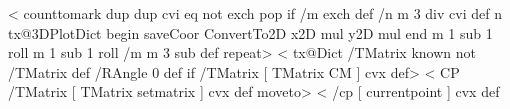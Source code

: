 %
\def\parametricPlotThreeD@iv{%
  \addto@pscode{%
    mark
    /n 0 def
    \psk@ThreeDplot@xPlotpoints\space {
      xyz
      /n n 2 add def
      n 2 roll
      /t t dt add def
    } repeat
  }%
  \@nameuse{endplot@\psplotstyle}%
}
%
%
\def\fileplotThreeD{\def\pst@par{}\pst@object{fileplotThreeD}}
\def\fileplotThreeD@i#1{%
    \pst@killglue%
    \begingroup%
	\use@par%
	\@pstfalse%
	\@nameuse{testqp@\psplotstyle}%
	\if@pst
	    \dataplotThreeD@ii{\pst@readfile{#1}}%
	\else
	    \listplotThreeD@ii{\pst@altreadfile{#1}}%
	\fi
    \endgroup%
    \ignorespaces%
}
%
%
\def\dataplotThreeD{\def\pst@par{}\pst@object{dataplotThreeD}}
\def\dataplotThreeD@i#1{%
  \pst@killglue
  \begingroup
    \use@par
    \@pstfalse
    \@nameuse{testqp@\psplotstyle}%
    \if@pst
      \dataplotThreeD@ii{\addto@pscode{#1}}%
    \else
      \listplot@ii{\addto@pscode{#1}}%
    \fi
  \endgroup
  \ignorespaces%
}
\def\dataplotThreeD@ii#1{%
  \@nameuse{beginplot@\psplotstyle}%
    \addto@pscode{%
      \IIIDplot@variables
      /Dx { /D { Dy } def } def
      /Dy { /D { Dz } def } def
      /Dz { 			%
        tx@3DPlotDict begin
	saveCoor
	ConvertTo2D
	x2D \pst@number\psxunit mul y2D \pst@number\psyunit mul 
	end
	Do /D { Dx } def } def
      /D { /D { Dx } def } def
      /Do {
        \@nameuse{beginqp@\psplotstyle}%
        /Do { \@nameuse{doqp@\psplotstyle}} def
      } def}%
    #1%
    \addto@pscode{D}%
  \@nameuse{endqp@\psplotstyle}%
}
%
%
<%
  counttomark dup dup cvi eq not { exch pop } if
  /m exch def /n m 3 div cvi def
  n { 				%
    tx@3DPlotDict begin
    saveCoor
    ConvertTo2D
    x2D \pst@number\psxunit mul y2D \pst@number\psyunit mul 
    end
    m 1 sub 1 roll m 1 sub 1 roll /m m 3 sub def } repeat>
%
%
\def\listplotThreeD{\def\pst@par{}\pst@object{listplotThreeD}}
\def\listplotThreeD@i#1{\listplotThreeD@ii{\addto@pscode{#1}}}
\def\listplotThreeD@ii#1{%
  \@nameuse{beginplot@\psplotstyle}%
  \addto@pscode{ \IIIDplot@variables  /D {} def mark }%
  #1%
  \addto@pscode{\tx@ScalePointsThreeD}%
  \@nameuse{endplot@\psplotstyle}%
}
%
%
<%
  tx@Dict /TMatrix known not { /TMatrix { } def /RAngle { 0 } def } if
  /TMatrix [ TMatrix CM ] cvx def>
%
<%
  CP /TMatrix [ TMatrix setmatrix ] cvx def moveto>
%
<%
  \tx@TMSave
  /cp [ currentpoint ] cvx def
